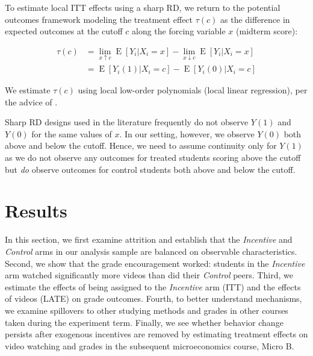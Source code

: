 \documentclass[12pt]{article}
\begin{document}
To estimate local ITT effects using a sharp RD, we return to the potential outcomes framework modeling the treatment effect $\tau(c)$ as the difference in expected outcomes at the cutoff $c$ along the forcing variable $x$ (midterm score):

\begin{equation} \label{rd_spec}
\begin{split}
	\tau(c) & = \lim_{x \uparrow c} \operatorname{E}[Y_i | X_i = x] - \lim_{x \downarrow c} \operatorname{E}[Y_i | X_i = x] \\
	& = \operatorname{E}[Y_i(1) | X_i = c] - \operatorname{E}[Y_i(0) | X_i = c]
\end{split}
\end{equation}

We estimate $\tau(c)$ using local low-order polynomials (local linear regression), per the advice of \textcite{gi2019}.

Sharp RD designs used in the literature frequently do not observe $Y(1)$ and $Y(0)$ for the same values of $x$. In our setting, however, we observe $Y(0)$ both above and below the cutoff. Hence, we need to assume continuity only for $Y(1)$ as we do not observe any outcomes for treated students scoring above the cutoff but \textit{do} observe outcomes for control students both above and below the cutoff.




\section{Results} \label{results}

In this section, we first examine attrition and establish that the \textit{Incentive} and \textit{Control} arms in our analysis sample are balanced on observable characteristics. Second, we show that the grade encouragement worked: students in the \textit{Incentive} arm watched significantly more videos than did their \textit{Control} peers. Third, we estimate the effects of being assigned to the \textit{Incentive} arm (ITT) and the effects of videos (LATE) on grade outcomes. Fourth, to better understand mechanisms, we examine spillovers to other studying methods and grades in other courses taken during the experiment term. Finally, we see whether behavior change persists after exogenous incentives are removed by estimating treatment effects on video watching and grades in the subsequent microeconomics course, Micro B.
\end{document}
